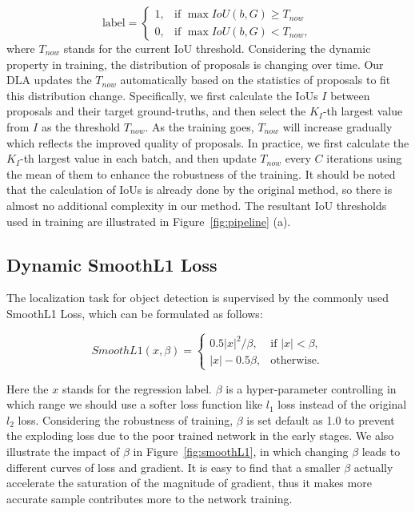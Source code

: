 \documentclass[runningheads]{llncs}
\begin{document}
\begin{equation}
    \text{label} =
    \begin{cases}
        1, & \mbox{if } \max IoU(b, G) \geq T_{now}\\
        0, & \mbox{if } \max IoU(b, G) < T_{now},
    \end{cases}
    \label{eq:dynamic_label_assign}
\end{equation}
where $T_{now}$ stands for the current IoU threshold. Considering the dynamic property in training, the distribution of proposals is changing over time. Our DLA updates the $T_{now}$ automatically based on the statistics of proposals to fit this distribution change. Specifically, we first calculate the IoUs $I$ between proposals and their target ground-truths, and then select the $K_I$-th largest value from $I$ as the threshold $T_{now}$. As the training goes, $T_{now}$ will increase gradually which reflects the improved quality of proposals. In practice, we first calculate the $K_I$-th largest value in each batch, and then update $T_{now}$ every $C$ iterations using the mean of them to enhance the robustness of the training. It should be noted that the calculation of IoUs is already done by the original method, so there is almost no additional complexity in our method.
The resultant IoU thresholds used in training are illustrated in Figure~\ref{fig:pipeline} (a).


\subsection{Dynamic SmoothL1 Loss}

The localization task for object detection is supervised by the commonly used SmoothL1 Loss, which can be formulated as follows:

\begin{equation}
    SmoothL1(x, \beta) =
    \begin{cases}
        0.5|x|^2/\beta, & \mbox{if }|x|<\beta, \\
        |x|-0.5\beta, & \mbox{otherwise}.
    \end{cases}
    \label{eq:smoothL1_loss}
\end{equation}

Here the $x$ stands for the regression label. $\beta$ is a hyper-parameter controlling in which range we should use a softer loss function like $l_1$ loss instead of the original $l_2$ loss. Considering the robustness of training, $\beta$ is set default as 1.0 to prevent the exploding loss due to the poor trained network in the early stages. We also illustrate the impact of $\beta$ in Figure~\ref{fig:smoothL1}, in which changing $\beta$ leads to different curves of loss and gradient. It is easy to find that a smaller $\beta$ actually accelerate the saturation of the magnitude of gradient, thus it makes more accurate sample contributes more to the network training.
\end{document}

